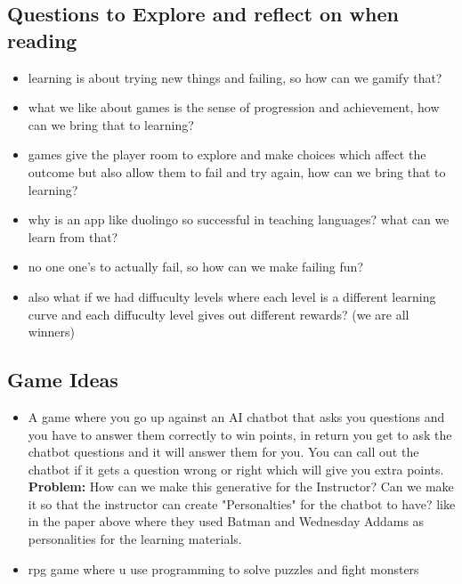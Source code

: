 \documentclass{article}
\begin{document}
\subsection{Questions to Explore and reflect on when reading}
\begin{itemize}
    \item learning is about trying new things and failing, so how can we gamify that?
    \item what we like about games is the sense of progression and achievement, how can we bring that to learning?
    \item games give the player room to explore and make choices which affect the outcome but also allow them to fail and try again, how can we bring that to learning?
    \item why is an app like duolingo so successful in teaching languages? what can we learn from that?
    \item no one one's to actually fail, so how can we make failing fun?
    \item also what if we had diffuculty levels where each level is a different learning curve and each diffuculty level gives out different rewards? (we are all winners)
\end{itemize}

\subsection{Game Ideas}
\begin{itemize}
    \item A game where you go up against an AI chatbot that asks you questions and you have to answer them correctly to win points, 
    in return you get to ask the chatbot questions and it will answer them for you. You can call out the chatbot if it gets a question wrong or right which will give you extra points. 
    \textbf{Problem:} How can we make this generative for the Instructor? Can we make it so that the instructor can create "Personalties" for the chatbot to have? 
    like in the paper above where they used Batman and Wednesday Addams as personalities for the learning materials.
    \item rpg game where u use programming to solve puzzles and fight monsters
\end{itemize}
\end{document}
